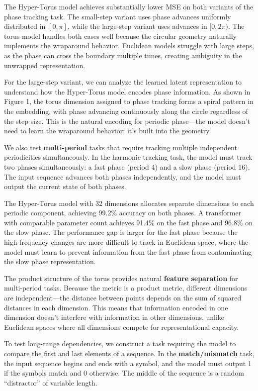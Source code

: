 \documentclass[12pt,letterpaper,twoside]{article}
\begin{document}
The Hyper-Torus model achieves substantially lower MSE on both variants of the phase tracking task. The small-step variant uses phase advances uniformly distributed in $[0, \pi]$, while the large-step variant uses advances in $[0, 2\pi)$. The torus model handles both cases well because the circular geometry naturally implements the wraparound behavior. Euclidean models struggle with large steps, as the phase can cross the boundary multiple times, creating ambiguity in the unwrapped representation.

For the large-step variant, we can analyze the learned latent representation to understand how the Hyper-Torus model encodes phase information. As shown in Figure 1, the torus dimension assigned to phase tracking forms a spiral pattern in the embedding, with phase advancing continuously along the circle regardless of the step size. This is the natural encoding for periodic phase—the model doesn't need to learn the wraparound behavior; it's built into the geometry.

We also test \textbf{multi-period} tasks that require tracking multiple independent periodicities simultaneously. In the harmonic tracking task, the model must track two phases simultaneously: a fast phase (period 4) and a slow phase (period 16). The input sequence advances both phases independently, and the model must output the current state of both phases.

The Hyper-Torus model with 32 dimensions allocates separate dimensions to each periodic component, achieving 99.2\% accuracy on both phases. A transformer with comparable parameter count achieves 91.4\% on the fast phase and 96.8\% on the slow phase. The performance gap is larger for the fast phase because the high-frequency changes are more difficult to track in Euclidean space, where the model must learn to prevent information from the fast phase from contaminating the slow phase representation.

The product structure of the torus provides natural \textbf{feature separation} for multi-period tasks. Because the metric is a product metric, different dimensions are independent—the distance between points depends on the sum of squared distances in each dimension. This means that information encoded in one dimension doesn't interfere with information in other dimensions, unlike Euclidean spaces where all dimensions compete for representational capacity.

To test long-range dependencies, we construct a task requiring the model to compare the first and last elements of a sequence. In the \textbf{match/mismatch} task, the input sequence begins and ends with a symbol, and the model must output 1 if the symbols match and 0 otherwise. The middle of the sequence is a random ``distractor'' of variable length.
\end{document}
